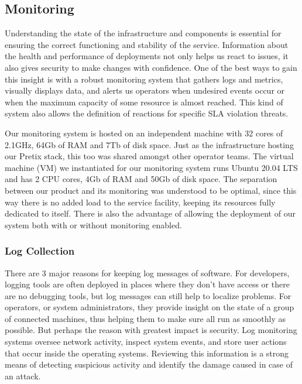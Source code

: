 \documentclass[12pt]{article}
\begin{document}
\vspace{-35pt}

\subsection{Monitoring} \label{management.monitoring} %


Understanding the state of the infrastructure and components is essential for ensuring the correct functioning and stability of the service.
Information about the health and performance of deployments not only helps us react to issues, it also gives security to make changes with confidence. 
One of the best ways to gain this insight is with a robust monitoring system that gathers logs and metrics, visually displays data, and alerts us operators when 
undesired events occur or when the maximum capacity of some resource is almost reached.
This kind of system also allows the definition of reactions for specific SLA violation threats.

Our monitoring system is hosted on an independent machine with 32 cores of 2.1GHz, 64Gb of RAM and 7Tb of disk space.
Just as the infrastructure hosting our Pretix stack, this too was shared amongst other operator teams.
The virtual machine (VM) we instantiated for our monitoring system runs Ubuntu 20.04 LTS and has 2 CPU cores, 4Gb of RAM and 50Gb of disk space.
The separation between our product and its monitoring was understood to be optimal, since this way there is no added load to the service facility, keeping its
resources fully dedicated to itself.
There is also the advantage of allowing the deployment of our system both with or without monitoring enabled.

\subsubsection{Log Collection}

There are 3 major reasons for keeping log messages of software.
For developers, logging tools are often deployed in places where they don’t have access or there are no debugging tools, but log messages can still help to 
localize problems.
For operators, or system administrators, they provide insight on the state of a group of connected machines, thus helping them to make sure all run as 
smoothly as possible.
But perhaps the reason with greatest impact is security.
Log monitoring systems oversee network activity, inspect system events, and store user actions that occur inside the operating systems.
Reviewing this information is a strong means of detecting suspicious activity and identify the damage caused in case of an attack.
\end{document}
